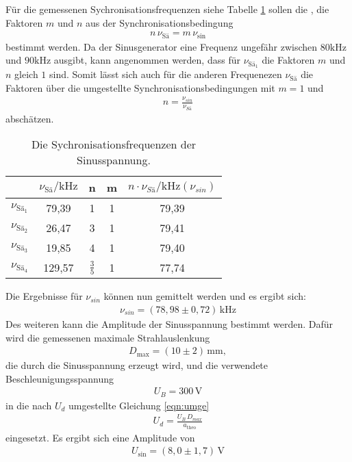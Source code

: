 Für die gemessenen Sychronisationsfrequenzen siehe Tabelle \ref{tab:syn}
sollen die ,
die Faktoren $m$ und $n$
aus der Synchronisationsbedingung
\begin{align*}
  n\,\nu_\mathrm{Sä}=m\,\nu_\mathrm{sin}
\end{align*}
bestimmt werden.
Da der Sinusgenerator eine Frequenz
ungefähr zwischen $80\si{\kilo\hertz}$ und $90\si{\kilo\hertz}$
ausgibt, kann angenommen werden, dass für $\nu_\mathrm{Sä_1}$ die Faktoren $m$ und $n$
gleich $1$ sind. Somit lässt sich auch für die anderen Frequenezen $\nu_\mathrm{Sä}$ die Faktoren über
die umgestellte Synchronisationsbedingungen  mit $m=1$ und
 \begin{align*}
   n=\frac{\nu_{sin}}{\nu_{Sä}}
 \end{align*}
 abschätzen.
\begin{table}
  \centering
  \caption{Die Sychronisationsfrequenzen der Sinusspannung.}
  \label{tab:syn}
  \begin{tabular}{c c c c c}
\toprule  %
 &  $ \nu_\mathrm{Sä} / \si{\kilo\hertz} $ & n & m & $n\cdot\nu_{Sä}/\si{\kilo\hertz} (\nu_{sin})$ \\
\midrule
$\nu_\mathrm{Sä_1}$ & 79,39  & 1 & 1 &  79,39  \\
$\nu_\mathrm{Sä_2}$ & 26,47  & 3 & 1 &  79,41  \\
$\nu_\mathrm{Sä_3}$ & 19,85  & 4 & 1 &  79,40  \\
$\nu_\mathrm{Sä_4}$ & 129,57 & $\frac{3}{5}$ & 1 & 77,74\\
\bottomrule
\end{tabular}
\end{table}
\FloatBarrier
Die Ergebnisse für  $\nu_{sin}$ können nun gemittelt werden und es ergibt sich:
\begin{align*}
  \nu_{sin}=(78,98\pm0,72)\,\si{\kilo\hertz} 
\end{align*}
Des weiteren kann die Amplitude der Sinusspannung bestimmt werden.
Dafür wird die gemessenen maximale Strahlauslenkung
\begin{align*}
D_\mathrm{max}=(10\pm2)\,\si{\milli\meter},
\end{align*}
die durch die Sinusspannung erzeugt wird,
und die verwendete Beschleunigungsspannung
\begin{align*}
U_B=300\,\si{\volt}
\end{align*}
in die nach $U_d$ umgestellte Gleichung \eqref{eqn:umge}
\begin{align}
U_d=\frac{U_B\,D_{max}}{a_\mathrm{theo}}\label{eqn:umge}
\end{align}
eingesetzt.
Es ergibt sich eine Amplitude von
\begin{align*}
U_\mathrm{sin}=(8,0\pm1,7)\,\si{\volt}
\end{align*}



